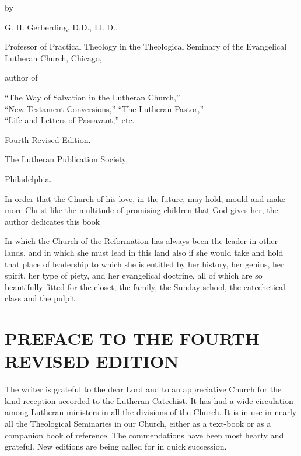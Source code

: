\begin{titelseite}


by

G. H. Gerberding, D.D., LL.D.,

Professor of Practical Theology in the Theological Seminary of the Evangelical Lutheran Church, Chicago,

author of

“The Way of Salvation in the Lutheran Church,”\\
“New Testament Conversions,” “The Lutheran Pastor,”\\
“Life and Letters of Passavant,” etc.

Fourth Revised Edition.

The Lutheran Publication Society,

Philadelphia.
\end{titelseite}

\begin{titelseite}


In order that the Church of his love, in the future, may hold, mould and make more Christ-like the multitude of promising children that God gives her, the author dedicates this book


In which the Church of the Reformation has always been the leader in other lands, and in which she must lead in this land also if she would take and hold that place of leadership to which she is entitled by her history, her genius, her spirit, her type of piety, and her evangelical doctrine, all of which are so beautifully fitted for the closet, the family, the Sunday school, the catechetical class and the pulpit.
\end{titelseite}

\chapter[Preface to the Fourth Revised Edition]{PREFACE TO THE FOURTH REVISED EDITION}

The writer is grateful to the dear Lord and to an appreciative Church for the kind reception accorded to the Lutheran Catechist. It has had a wide circulation among Lutheran ministers in all the divisions of the Church. It is in use in nearly all the Theological Seminaries in our Church, either as a text-book or as a companion book of reference. The commendations have been most hearty and grateful. New editions are being called for in quick succession.


